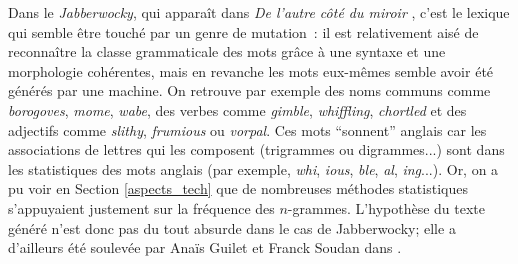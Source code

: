 \documentclass{article}
\begin{document}
				Dans le \textit{Jabberwocky}, qui apparaît dans \textit{De l'autre côté du miroir} \cite{carroll1871}, c'est le lexique qui semble être touché par un genre de mutation~: il est relativement aisé de reconnaître la classe grammaticale des mots grâce à une syntaxe et une morphologie cohérentes, mais en revanche les mots eux-mêmes semble avoir été générés par une machine. On retrouve par exemple des noms communs comme \textit{borogoves}, \textit{mome}, \textit{wabe}, des verbes comme \textit{gimble}, \textit{whiffling}, \textit{chortled} et des adjectifs comme \textit{slithy}, \textit{frumious} ou \textit{vorpal}. Ces mots ``sonnent'' anglais car les associations de lettres qui les composent (trigrammes ou digrammes...) sont dans les statistiques des mots anglais (par exemple, \textit{whi}, \textit{ious}, \textit{ble}, \textit{al}, \textit{ing}...). Or, on a pu voir en Section \ref{aspects_tech} que de nombreuses méthodes statistiques s'appuyaient justement sur la fréquence des $n$-grammes. L'hypothèse du texte généré n'est donc pas du tout absurde dans le cas de Jabberwocky; elle a d'ailleurs été soulevée par Anaïs Guilet et Franck Soudan dans \cite{guilet2017}.\\
				
\end{document}
